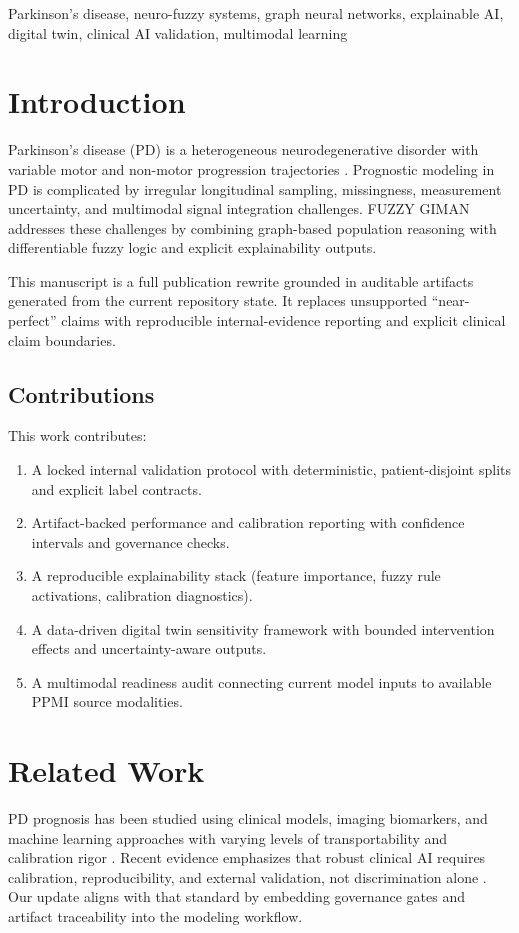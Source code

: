\documentclass[conference]{IEEEtran}
\begin{document}
\begin{IEEEkeywords}
Parkinson's disease, neuro-fuzzy systems, graph neural networks, explainable AI, digital twin, clinical AI validation, multimodal learning
\end{IEEEkeywords}

\section{Introduction}
Parkinson's disease (PD) is a heterogeneous neurodegenerative disorder with variable motor and non-motor progression trajectories \cite{dorsey2018parkinsons,poewe2017parkinson}. Prognostic modeling in PD is complicated by irregular longitudinal sampling, missingness, measurement uncertainty, and multimodal signal integration challenges. FUZZY GIMAN addresses these challenges by combining graph-based population reasoning with differentiable fuzzy logic and explicit explainability outputs.

This manuscript is a full publication rewrite grounded in auditable artifacts generated from the current repository state. It replaces unsupported ``near-perfect'' claims with reproducible internal-evidence reporting and explicit clinical claim boundaries.

\subsection{Contributions}
This work contributes:
\begin{enumerate}
\item A locked internal validation protocol with deterministic, patient-disjoint splits and explicit label contracts.
\item Artifact-backed performance and calibration reporting with confidence intervals and governance checks.
\item A reproducible explainability stack (feature importance, fuzzy rule activations, calibration diagnostics).
\item A data-driven digital twin sensitivity framework with bounded intervention effects and uncertainty-aware outputs.
\item A multimodal readiness audit connecting current model inputs to available PPMI source modalities.
\end{enumerate}

\section{Related Work}
PD prognosis has been studied using clinical models, imaging biomarkers, and machine learning approaches with varying levels of transportability and calibration rigor \cite{marek2011ppmi,nalls2019identification,holzinger2019causability}. Recent evidence emphasizes that robust clinical AI requires calibration, reproducibility, and external validation, not discrimination alone \cite{guo2017calibration,moons2012risk}. Our update aligns with that standard by embedding governance gates and artifact traceability into the modeling workflow.
\end{document}
